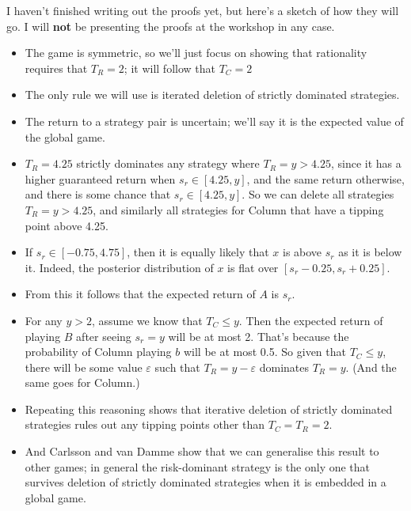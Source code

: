 I haven't finished writing out the proofs yet, but here's a sketch of how they will go. I will \textbf{not} be presenting the proofs at the workshop in any case.

\begin{itemize}
\item The game is symmetric, so we'll just focus on showing that rationality requires that $T_R = 2$; it will follow that $T_C = 2$

\item The only rule we will use is iterated deletion of strictly dominated strategies.

\item The return to a strategy pair is uncertain; we'll say it is the expected value of the global game.

\item $T_R = 4.25$ strictly dominates any strategy where $T_R  = y > 4.25$, since it has a higher guaranteed return when $s_r \in [4.25, y]$, and the same return otherwise, and there is some chance that $s_r \in [4.25, y]$. So we can delete all strategies $T_R  = y > 4.25$, and similarly all strategies for Column that have a tipping point above 4.25.

\item If $s_r \in [-0.75, 4.75]$, then it is equally likely that $x$ is above $s_r$ as it is below it. Indeed, the posterior distribution of $x$ is flat over $[s_r - 0.25, s_r + 0.25]$.

\item From this it follows that the expected return of $A$ is $s_r$.

\item For any $y > 2$, assume we know that $T_C \leq y$. Then the expected return of playing $B$ after seeing $s_r = y$ will be at most 2. That's because the probability of Column playing $b$ will be at most 0.5. So given that $T_C \leq y$, there will be some value $\varepsilon$ such that $T_R = y - \varepsilon$ dominates $T_R = y$. (And the same goes for Column.)

\item Repeating this reasoning shows that iterative deletion of strictly dominated strategies rules out any tipping points other than $T_C = T_R = 2$.

\item And Carlsson and van Damme show that we can generalise this result to other games; in general the risk-dominant strategy is the only one that survives deletion of strictly dominated strategies when it is embedded in a global game.

\end{itemize}
